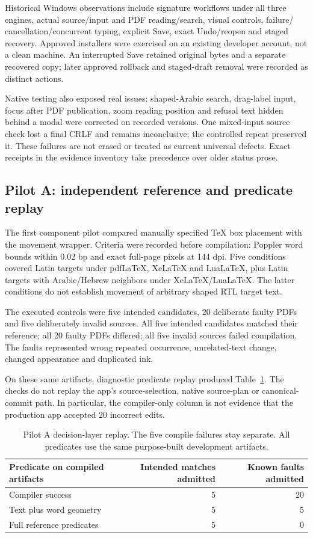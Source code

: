 Historical Windows observations include signature workflows under all three
engines, actual source/input and PDF reading/search, visual controls, failure/
cancellation/concurrent typing, explicit Save, exact Undo/reopen and staged
recovery. Approved installers were exercised on an existing developer account,
not a clean machine. An interrupted Save retained original bytes and a separate
recovered copy; later approved rollback and staged-draft removal were recorded
as distinct actions.

Native testing also exposed real issues: shaped-Arabic search, drag-label
input, focus after PDF publication, zoom reading position and refusal text
hidden behind a modal were corrected on recorded versions. One mixed-input
source check lost a final CRLF and remains inconclusive; the controlled repeat
preserved it. These failures are not erased or treated as current universal
defects. Exact receipts in the evidence inventory take precedence over older
status prose.

\subsection{Pilot A: independent reference and predicate replay}
The first component pilot compared manually specified TeX box placement with
the movement wrapper. Criteria were recorded before compilation: Poppler word
bounds within 0.02 bp and exact full-page pixels at 144 dpi. Five conditions
covered Latin targets under pdfLaTeX, XeLaTeX and LuaLaTeX, plus Latin targets
with Arabic/Hebrew neighbors under XeLaTeX/LuaLaTeX. The latter conditions do
not establish movement of arbitrary shaped RTL target text.

The executed controls were five intended candidates, 20 deliberate faulty
PDFs and five deliberately invalid sources. All five intended candidates
matched their reference; all 20 faulty PDFs differed; all five invalid sources
failed compilation. The faults represented wrong repeated occurrence,
unrelated-text change, changed appearance and duplicated ink.

On these same artifacts, diagnostic predicate replay produced
Table~\ref{tab:replay}. The checks do not replay the app's source-selection,
native source-plan or canonical-commit path. In particular, the compiler-only
column is not evidence that the production app accepted 20 incorrect edits.

\begin{table}[htbp]
\centering\small
\begin{tabular}{@{}lrr@{}}
\toprule
Predicate on compiled artifacts & Intended matches admitted & Known faults admitted\\
\midrule
Compiler success & 5 & 20\\
Text plus word geometry & 5 & 5\\
Full reference predicates & 5 & 0\\
\bottomrule
\end{tabular}
\caption{Pilot A decision-layer replay. The five compile failures stay separate.
All predicates use the same purpose-built development artifacts.}
\label{tab:replay}
\end{table}

